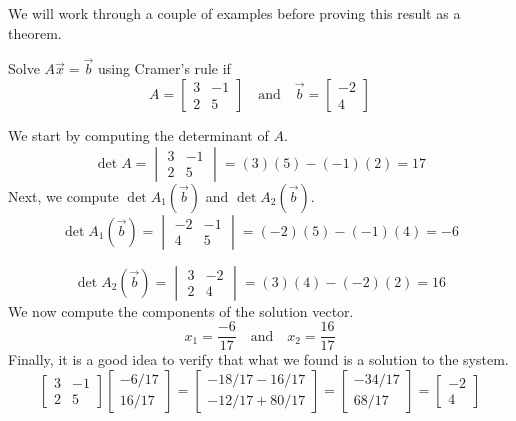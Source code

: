 \documentclass{ximera}
\begin{document}
We will work through a couple of examples before proving this result as a theorem.

\begin{example}\label{ex:cramer2by2}
Solve $A\vec{x}=\vec{b}$ using Cramer's rule if
$$A=\begin{bmatrix}3&-1\\2&5\end{bmatrix}\quad\text{and}\quad \vec{b}=\begin{bmatrix}-2\\4\end{bmatrix}$$

\begin{explanation}
We start by computing the determinant of $A$.
$$\det{A}=\begin{vmatrix}3&-1\\2&5\end{vmatrix}=(3)(5)-(-1)(2)=17$$
Next, we compute $\det{A_1(\vec{b})}$ and $\det{A_2(\vec{b})}$.
$$\det{A_1(\vec{b})}=\begin{vmatrix}-2&-1\\4&5\end{vmatrix}=(-2)(5)-(-1)(4)=-6$$

$$\det{A_2(\vec{b})}=\begin{vmatrix}3&-2\\2&4\end{vmatrix}=(3)(4)-(-2)(2)=16$$
We now compute the components of the solution vector.
$$x_1=\frac{-6}{17}\quad\text{and}\quad x_2=\frac{16}{17}$$
Finally, it is a good idea to verify that what we found is a solution to the system.
$$\begin{bmatrix}3&-1\\2&5\end{bmatrix}\begin{bmatrix}-6/17\\16/17\end{bmatrix}=\begin{bmatrix}-18/17-16/17\\-12/17+80/17\end{bmatrix}=\begin{bmatrix}-34/17\\68/17\end{bmatrix}=\begin{bmatrix}-2\\4\end{bmatrix}$$
\end{explanation}
\end{example}
\end{document}
